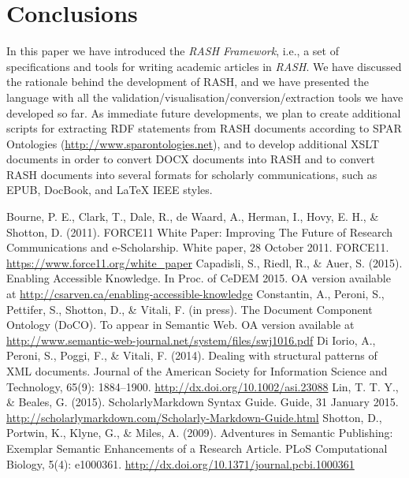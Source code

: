 \documentclass[runningheads,a4paper]{llncs}
\begin{document}
\section{Conclusions}\label{sec_conclusions}

In this paper we have introduced the {\em RASH Framework}, i.e., a set of specifications and tools for writing academic articles in {\em RASH}. We have discussed the rationale behind the development of RASH, and we have presented the language with all the validation/visualisation/conversion/extraction tools we have developed so far. As immediate future developments, we plan to create additional scripts for extracting RDF statements from RASH documents according to SPAR Ontologies (\url{http://www.sparontologies.net}), and to develop additional XSLT documents in order to convert DOCX documents into RASH and to convert RASH documents into several formats for scholarly communications, such as EPUB, DocBook, and LaTeX IEEE styles.

\begin{thebibliography}{4}

 Bourne, P. E., Clark, T., Dale, R., de Waard, A., Herman, I., Hovy, E. H., \& Shotton, D. (2011). FORCE11 White Paper: Improving The Future of Research Communications and e-Scholarship. White paper, 28 October 2011. FORCE11. \url{https://www.force11.org/white\_paper}
 Capadisli, S., Riedl, R., \& Auer, S. (2015). Enabling Accessible Knowledge. In Proc. of CeDEM 2015. OA version available at \url{http://csarven.ca/enabling-accessible-knowledge}
 Constantin, A., Peroni, S., Pettifer, S., Shotton, D., \& Vitali, F. (in press). The Document Component Ontology (DoCO). To appear in Semantic Web. OA version available at \url{http://www.semantic-web-journal.net/system/files/swj1016.pdf}
 Di Iorio, A., Peroni, S., Poggi, F., \& Vitali, F. (2014). Dealing with structural patterns of XML documents. Journal of the American Society for Information Science and Technology, 65(9): 1884--1900. \url{http://dx.doi.org/10.1002/asi.23088}
 Lin, T. T. Y., \& Beales, G. (2015). ScholarlyMarkdown Syntax Guide. Guide, 31 January 2015. \url{http://scholarlymarkdown.com/Scholarly-Markdown-Guide.html}
 Shotton, D., Portwin, K., Klyne, G., \& Miles, A. (2009). Adventures in Semantic Publishing: Exemplar Semantic Enhancements of a Research Article. PLoS Computational Biology, 5(4): e1000361. \url{http://dx.doi.org/10.1371/journal.pcbi.1000361}

\end{thebibliography}
\end{document}
